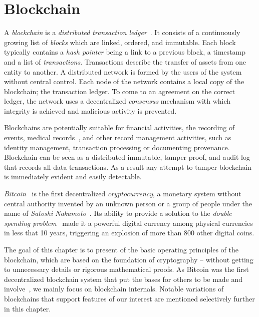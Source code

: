 \chapter{Blockchain}
\label{blockchain}

A \textit{blockchain} is a \textit{distributed transaction ledger}~\cite{nakamoto2012bitcoin}. It consists of a continuously growing list of \textit{blocks} which are linked, ordered, and immutable. Each block typically contains a \textit{hash pointer} being a link to a previous block, a timestamp and a list of \textit{transactions}. Transactions describe the transfer of assets from one entity to another. A distributed network is formed by the users of the system without central control. Each node of the network contains a local copy of the blockchain; the transaction ledger. To come to an agreement on the correct ledger, the network uses a decentralized \textit{consensus} mechanism with which integrity is achieved and malicious activity is prevented.

Blockchains are potentially suitable for financial activities, the recording of events, medical records~\cite{blockchain_ehr,Azaria2016}, and other record management activities, such as identity management, transaction processing or documenting provenance. Blockchain can be seen as a distributed immutable, tamper-proof, and audit log that records all data transactions. As a result any attempt to tamper blockchain is immediately evident and easily detectable.

\textit{Bitcoin}~\cite{nakamoto2012bitcoin} is the first decentralized \textit{cryptocurrency}, a monetary system without central authority invented by an unknown person or a group of people under the name of \textit{Satoshi Nakamoto}~\cite{nakamoto2012bitcoin}. Its ability to provide a solution to the \textit{double spending problem}~\cite{double_spent, nakamoto2012bitcoin} made it a powerful digital currency among physical currencies in less that 10 years, triggering an explosion of more than 800 other digital coins.

The goal of this chapter is to present of the basic operating principles of the blockchain, which are based on the foundation of cryptography -- without getting to unnecessary details or rigorous mathematical proofs. As Bitcoin was the first decentralized blockchain system that put the bases for others to be made and involve~\cite{7163021,10.1007/978-3-662-46803-6_10, ethereum_whitepaper}, we mainly focus on blockchain internals. Notable variations of blockchains that support features of our interest are mentioned selectively further in this chapter.

